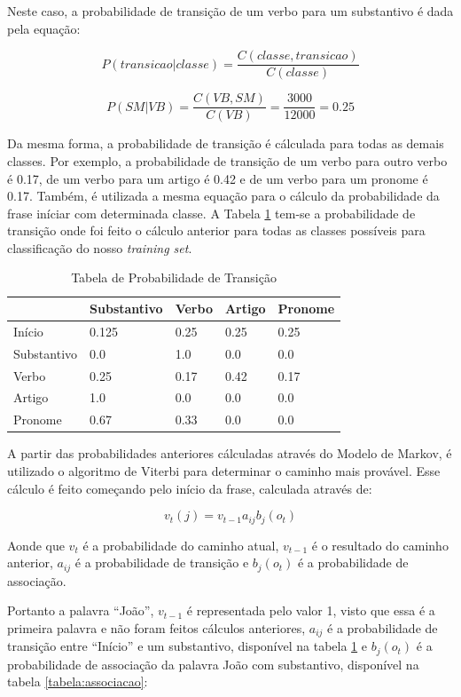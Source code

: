 Neste caso, a probabilidade de transição de um verbo para um substantivo é dada
pela equação:

\[ P(transicao|classe) = \frac{C(classe,transicao)}{C(classe)} \]

\[ P(SM|VB) = \frac{C(VB,SM)}{C(VB)} = \frac{3000}{12000} = 0.25 \]

Da mesma forma, a probabilidade de transição é cálculada para todas as
demais classes. Por exemplo, a probabilidade de
transição de um verbo para outro verbo é 0.17, de um verbo para um artigo é 0.42
e de um verbo para um pronome é 0.17. Também, é utilizada a mesma equação para
o cálculo da probabilidade da frase iníciar com determinada classe. A Tabela
\ref{tabela:transicao} tem-se a probabilidade de transição onde foi feito o cálculo anterior para todas as classes possíveis para classificação do nosso \textit{training set}.



\begin{table}[htb]
\centering
\begin{tabular}{|l|l|l|l|l|}
\hline
& Substantivo & Verbo & Artigo & Pronome \\ \hline
Início      & 0.125       & 0.25  & 0.25   & 0.25    \\ \hline
Substantivo & 0.0         & 1.0   & 0.0    & 0.0     \\ \hline
Verbo       & 0.25        & 0.17  & 0.42   & 0.17    \\ \hline
Artigo      & 1.0         & 0.0   & 0.0    & 0.0     \\ \hline
Pronome     & 0.67        & 0.33  & 0.0    & 0.0     \\ \hline
\end{tabular}
\caption{Tabela de Probabilidade de Transição}
\label{tabela:transicao}
\end{table}

A partir das probabilidades anteriores cálculadas através do Modelo de Markov, é
utilizado o algoritmo de Viterbi para determinar o caminho mais provável. Esse cálculo
é feito começando pelo início da frase, calculada através de:

\[ v_t(j) = v_{t-1} a_{ij} b_j(o_t) \]

Aonde que $v_t$ é a probabilidade do caminho atual, $v_{t-1}$ é o resultado do
caminho anterior, $a_{ij}$ é a probabilidade de transição e $b_j(o_t)$ é a
probabilidade de associação.

Portanto a palavra ``João'', $v_{t-1}$ é representada pelo valor 1, visto
que essa é a primeira palavra e não foram feitos cálculos anteriores, $a_{ij}$ é
a probabilidade de transição entre ``Início'' e um substantivo, disponível na tabela \ref{tabela:transicao} e $b_j(o_t)$ é
a probabilidade de associação da palavra João com substantivo, disponível na
tabela \ref{tabela:associacao}:

